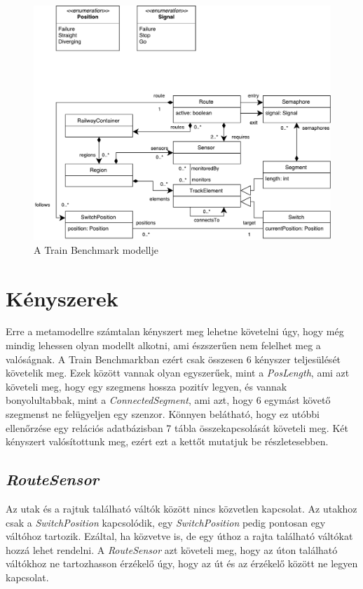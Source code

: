 \begin{figure}
	\includegraphics[width=\linewidth, keepaspectratio]{figures/model.pdf}
	\caption{A Train Benchmark modellje}
	\label{fig:ModelDiagram}
\end{figure}

\section{Kényszerek}

Erre a metamodellre számtalan kényszert meg lehetne követelni úgy, hogy még mindig lehessen olyan modellt alkotni, ami észszerűen nem felelhet meg a valóságnak. A Train Benchmarkban ezért csak összesen 6 kényszer teljesülését követelik meg. Ezek között vannak olyan egyszerűek, mint a \emph{PosLength}, ami azt követeli meg, hogy egy szegmens hossza pozitív legyen, és vannak bonyolultabbak, mint a \emph{ConnectedSegment}, ami azt, hogy 6 egymást követő szegmenst ne felügyeljen egy szenzor. Könnyen belátható, hogy ez utóbbi ellenőrzése egy relációs adatbázisban 7 tábla összekapcsolását követeli meg.
Két kényszert valósítottunk meg, ezért ezt a kettőt mutatjuk be részletesebben.

\subsection{\emph{RouteSensor}}

Az utak és a rajtuk található váltók között nincs közvetlen kapcsolat. Az utakhoz csak a \emph{SwitchPosition} kapcsolódik, egy \emph{SwitchPosition} pedig pontosan egy váltóhoz tartozik. Ezáltal, ha közvetve is, de egy úthoz a rajta található váltókat hozzá lehet rendelni. A \emph{RouteSensor} azt követeli meg, hogy az úton található váltókhoz ne tartozhasson érzékelő úgy, hogy az út és az érzékelő között ne legyen kapcsolat.

